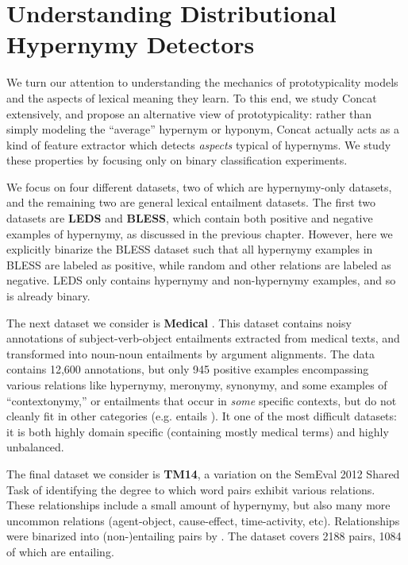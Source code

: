 \section{Understanding Distributional Hypernymy Detectors}

We turn our attention to understanding the mechanics of prototypicality models
and the aspects of lexical meaning they learn.
To this end, we study Concat extensively, and
propose an alternative view of prototypicality: rather than simply modeling the
``average'' hypernym or hyponym, Concat actually acts as a kind of feature
extractor which detects {\em aspects} typical of hypernyms.  We study these
properties by focusing only on binary classification experiments.

We focus on four different datasets, two of which are hypernymy-only datasets, and the remaining two are general lexical entailment datasets. The first
two datasets are {\bf LEDS} and {\bf BLESS}, which contain both positive and
negative examples of hypernymy, as discussed in the previous chapter. However,
here we explicitly binarize the BLESS dataset such that all hypernymy examples
in BLESS are labeled as positive, while random and other relations are labeled
as negative. LEDS only contains hypernymy and non-hypernymy examples, and so is
already binary.

The next dataset we consider is {\bf Medical} \cite{levy:2014:conll}. This
dataset contains noisy annotations of subject-verb-object entailments
extracted from medical texts, and transformed into noun-noun entailments by
argument alignments. The data contains 12,600 annotations, but only 945
positive examples encompassing various relations like hypernymy, meronymy,
synonymy, and some examples of ``contextonymy,'' or entailments that occur in
{\em some} specific contexts, but do not cleanly fit in other categories (e.g.
 entails ). It one of the most difficult datasets:
it is both highly domain specific (containing mostly medical terms) and highly
unbalanced.

The final dataset we consider is {\bf TM14}, a variation on the SemEval 2012
Shared Task of identifying the degree to which word pairs exhibit various
relations. These relationships include a small amount of hypernymy, but also
many more uncommon relations (agent-object, cause-effect, time-activity, etc).
Relationships were binarized into (non-)entailing pairs by
.  The dataset covers 2188 pairs, 1084 of which are
entailing.

